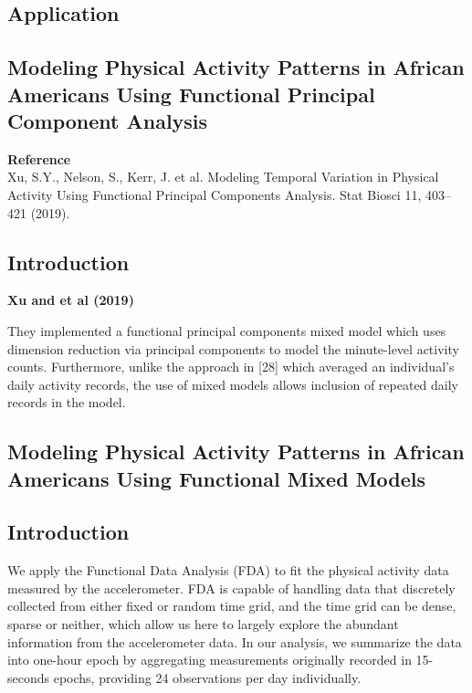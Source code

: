 \documentclass[12pt]{article}
\begin{document}
\subsection{Application}

\newpage

\hrulefill
\begin{center}
\section{Modeling Physical Activity Patterns in African Americans Using Functional Principal Component Analysis}
\end{center}
\hrulefill

\textbf{Reference}\\

Xu, S.Y., Nelson, S., Kerr, J. et al. Modeling Temporal Variation in Physical Activity Using
Functional Principal Components Analysis. Stat Biosci 11, 403–421 (2019).
\subsection{Introduction}

\textbf{Xu and et al (2019)}

    They implemented a functional principal components mixed model which uses dimension reduction via principal
    components to model the minute-level activity counts. Furthermore, unlike the approach in [28] which averaged
    an individual’s daily activity records, the use of mixed models allows inclusion of repeated daily records in the model.


\newpage

\hrulefill
\begin{center}
\section{Modeling Physical Activity Patterns in African Americans Using Functional Mixed Models}
\end{center}
\hrulefill

\subsection{Introduction}

We apply the Functional Data Analysis (FDA) to fit the physical activity data measured by
the accelerometer. FDA is capable of handling data that discretely collected from either
fixed or random time grid, and the time grid can be dense, sparse or neither, which allow
us here to largely explore the abundant information from the accelerometer data. In our analysis,
we summarize the data into one-hour epoch by aggregating measurements originally recorded
in 15-seconds epochs, providing 24 observations per day individually.
\end{document}
